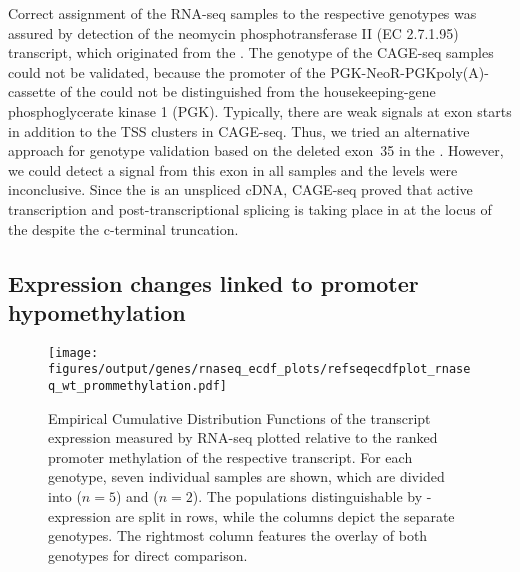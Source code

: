 Correct assignment of the RNA-seq samples to the respective genotypes was assured by detection of the neomycin phosphotransferase II (EC 2.7.1.95) transcript, which originated from the \dnmtcallele \supplefig. The genotype of the CAGE-seq samples could not be validated, because the promoter of the PGK-NeoR-PGKpoly(A)- cassette of the \dnmtcallele could not be distinguished from the housekeeping-gene phosphoglycerate kinase 1 (PGK). Typically, there are weak signals at exon starts in addition to the TSS clusters in CAGE-seq. Thus, we tried an alternative approach for genotype validation based on the deleted exon~35 in the \dnmtcallele. However, we could detect a signal from this exon in all samples and the levels were inconclusive. Since the \dnmtchipallele is an unspliced cDNA, CAGE-seq proved that active transcription and post-transcriptional splicing is taking place in \dnmtchip at the locus of the \dnmtcallele despite the c-terminal truncation.

\subsection{Expression changes linked to promoter hypomethylation}
\label{chap:r:transcription:promhypooverall}\label{chap:r:transcription:strayreference}

\begin{figure}[!ht]
	\centering
	\texttt{[image: figures/output/genes/rnaseq\_ecdf\_plots/refseqecdfplot\_rnaseq\_wt\_prommethylation.pdf]} 
	\caption{Empirical Cumulative Distribution Functions of the transcript expression measured by RNA-seq plotted relative to the ranked promoter methylation of the respective transcript. For each genotype, seven individual samples are shown, which are divided into \kithi ($n\!= \!5$) and \kitlow ($n\!= \!2$). The populations distinguishable by \kit-expression are split in rows, while the columns depict the separate genotypes. The rightmost column features the overlay of both genotypes for direct comparison.}
	\label{fig:refseqecdfplot_rnaseq_wt_prommethylation}
\end{figure}


